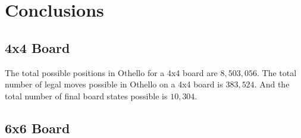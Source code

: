 \documentclass{article}
\begin{document}
\newpage

\section{Conclusions}

\subsection{4x4 Board}

The total possible positions in Othello for a 4x4 board are $8,503,056$.\cite{wiki} The total number of legal moves possible in Othello on a 4x4 board is $383,524$. And the total number of final board states possible is $10,304$.

\subsection{6x6 Board}



\newpage
\printbibliography[title={Bibliography}]
\end{document}
